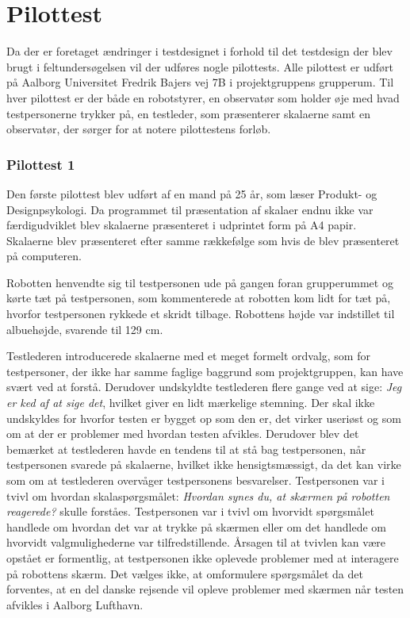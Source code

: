 \section{Pilottest}
\label{TestAfSkalaPilottest}
%
Da der er foretaget ændringer i testdesignet i forhold til det testdesign der blev brugt i feltundersøgelsen vil der udføres nogle pilottests. Alle pilottest er udført på Aalborg Universitet Fredrik Bajers vej 7B i projektgruppens grupperum. Til hver pilottest er der både en robotstyrer, en observatør som holder øje med hvad testpersonerne trykker på, en testleder, som præsenterer skalaerne samt en observatør, der sørger for at notere pilottestens forløb.  

\subsubsection*{Pilottest 1}
\label{TestAfSkalaerPilot1}
%
Den første pilottest blev udført af en mand på 25 år, som læser Produkt- og Designpsykologi. Da programmet til præsentation af skalaer endnu ikke var færdigudviklet blev skalaerne præsenteret i udprintet form på A4 papir. Skalaerne blev præsenteret efter samme rækkefølge som hvis de blev præsenteret på computeren.

Robotten henvendte sig til testpersonen ude på gangen foran grupperummet og kørte tæt på testpersonen, som kommenterede at robotten kom lidt for tæt på, hvorfor testpersonen rykkede et skridt tilbage. Robottens højde var indstillet til albuehøjde, svarende til 129 cm. 

Testlederen introducerede skalaerne med et meget formelt ordvalg, som for testpersoner, der ikke har samme faglige baggrund som projektgruppen, kan have svært ved at forstå. Derudover undskyldte testlederen flere gange ved at sige: \textit{Jeg er ked af at sige det}, hvilket giver en lidt mærkelige stemning. Der skal ikke undskyldes for hvorfor testen er bygget op som den er, det virker useriøst og som om at der er problemer med hvordan testen afvikles. Derudover blev det bemærket at testlederen havde en tendens til at stå bag testpersonen, når testpersonen svarede på skalaerne, hvilket ikke hensigtsmæssigt, da det kan virke som om at testlederen overvåger testpersonens besvarelser.\blankline
%
Testpersonen var i tvivl om hvordan skalaspørgsmålet: \textit{Hvordan synes du, at skærmen på robotten reagerede?} skulle forståes. Testpersonen var i tvivl om hvorvidt spørgsmålet handlede om hvordan det var at trykke på skærmen eller om det handlede om hvorvidt valgmulighederne var tilfredstillende. Årsagen til at tvivlen kan være opstået er formentlig, at testpersonen ikke oplevede problemer med at interagere på robottens skærm. Det vælges ikke, at omformulere spørgsmålet da det forventes, at en del danske rejsende vil opleve problemer med skærmen når testen afvikles i Aalborg Lufthavn. 

